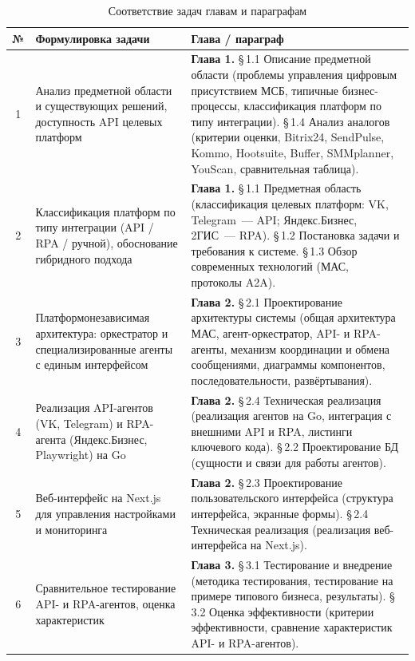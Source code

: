 \documentclass[12pt]{G7-32}
\begin{document}
\begin{table}[H]
  \caption{Соответствие задач главам и параграфам}
  \label{tab:plan}
  \small
  \begin{tabularx}{\textwidth}{|c|p{3.2cm}|X|}
    \hline
    \textbf{№} & \textbf{Формулировка задачи} & \textbf{Глава / параграф} \\
    \hline
    1 & Анализ предметной области и существующих решений, доступность API целевых платформ & \textbf{Глава 1.} \S\,1.1 Описание предметной области (проблемы управления цифровым присутствием МСБ, типичные бизнес-процессы, классификация платформ по типу интеграции). \S\,1.4 Анализ аналогов (критерии оценки, Bitrix24, SendPulse, Kommo, Hootsuite, Buffer, SMMplanner, YouScan, сравнительная таблица). \\
    \hline
    2 & Классификация платформ по типу интеграции (API / RPA / ручной), обоснование гибридного подхода & \textbf{Глава 1.} \S\,1.1 Предметная область (классификация целевых платформ: VK, Telegram~--- API; Яндекс.Бизнес, 2ГИС~--- RPA). \S\,1.2 Постановка задачи и требования к системе. \S\,1.3 Обзор современных технологий (МАС, протоколы A2A). \\
    \hline
    3 & Платформонезависимая архитектура: оркестратор и специализированные агенты с единым интерфейсом & \textbf{Глава 2.} \S\,2.1 Проектирование архитектуры системы (общая архитектура МАС, агент-оркестратор, API- и RPA-агенты, механизм координации и обмена сообщениями, диаграммы компонентов, последовательности, развёртывания). \\
    \hline
    4 & Реализация API-агентов (VK, Telegram) и RPA-агента (Яндекс.Бизнес, Playwright) на Go & \textbf{Глава 2.} \S\,2.4 Техническая реализация (реализация агентов на Go, интеграция с внешними API и RPA, листинги ключевого кода). \S\,2.2 Проектирование БД (сущности и связи для работы агентов). \\
    \hline
    5 & Веб-интерфейс на Next.js для управления настройками и мониторинга & \textbf{Глава 2.} \S\,2.3 Проектирование пользовательского интерфейса (структура интерфейса, экранные формы). \S\,2.4 Техническая реализация (реализация веб-интерфейса на Next.js). \\
    \hline
    6 & Сравнительное тестирование API- и RPA-агентов, оценка характеристик & \textbf{Глава 3.} \S\,3.1 Тестирование и внедрение (методика тестирования, тестирование на примере типового бизнеса, результаты). \S\,3.2 Оценка эффективности (критерии эффективности, сравнение характеристик API- и RPA-агентов). \\
    \hline
  \end{tabularx}
\end{table}
\end{document}
